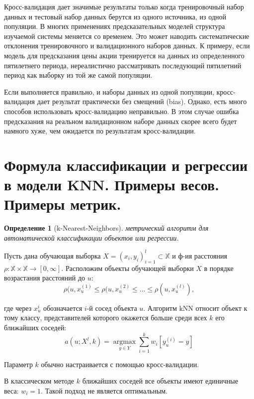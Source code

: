 \documentclass[a4paper, 12pt]{article}
\DeclareMathOperator{\argmax}{argmax }
\theoremstyle{plain} %
\newtheorem{definition}{Определение}
\theoremstyle{definition} %
\theoremstyle{remark} %
\begin{document}
Кросс-валидация дает значимые результаты только когда тренировочный набор данных и тестовый набор данных берутся из одного источника, из одной популяции. В многих применениях предсказательных моделей структура изучаемой системы меняется со временем. Это может наводить систематические отклонения тренировочного и валидационного наборов данных. К примеру, если модель для предсказания цены акции тренируется на данных из определенного пятилетнего периода, нереалистично рассматривать последующий пятилетний период как выборку из той же самой популяции.

Если выполняется правильно, и наборы данных из одной популяции, кросс-валидация дает результат практически без смещений (bias). Однако, есть много способов использовать кросс-валидацию неправильно. В этом случае ошибка предсказания на реальном валидационном наборе данных скорее всего будет намного хуже, чем ожидается по результатам кросс-валидации.

\section{Формула классификации и регрессии в модели KNN. Примеры весов. Примеры метрик.}

\begin{definition}[k-Nearest-Neighbors]
	метрический алгоритм для автоматической классификации объектов или регрессии.
\end{definition}

Пусть дана обучающая выборка $X = (x_{i}, y_{i})^{l}_{i=1} \subset \mathbb{X}$ и ф-ия расстояния $\rho : \mathbb{X} \times \mathbb{X} \to [0, \infty]$. Расположим объекты обучающей выборки $X$ в порядке возрастания расстояний до $u$:
\[
	\rho(u, x_{u}^{(1)} \leqslant \rho(u, x_{u}^{(2)} \leqslant ... \leqslant \rho(u, x_{u}^{(l)}),
\]

где через $x_{u}^{i}$ обозначается $i$-й сосед объекта $u$. Алгоритм kNN относит объект к тому классу, представителей которого окажется больше среди всех $k$ его ближайших соседей:
\[
	a(u; X^{l}, k) = \underset{y \in Y}{\argmax} \sum^{k}_{i=1}w_{i}[y_{u}^{(i)} = y]
\]

Параметр $k$ обычно настраивается с помощью кросс-валидации.

В классическом методе $k$ ближайших соседей все объекты имеют единичные веса: $w_{i}=1$. Такой подход не является оптимальным.
\end{document}
